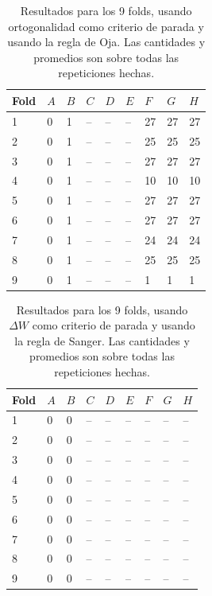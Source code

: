 \documentclass[informe.tex]{subfiles}
\begin{document}
	
	\begin{table}[H]
	  \centering
	  \begin{tabular}{|l|l|l|l|l|l|l|l|l|} \hline
	  Fold & $A$ & $B$ & $C$ & $D$ & $E$ & $F$ & $G$ & $H$ \\ \hline
	  1& 0 & 1 & -- & -- & -- & 27 & 27 & 27 \\ \hline
	  2& 0 & 1 & -- & -- & -- & 25 & 25 & 25 \\ \hline
	  3& 0 & 1 & -- & -- & -- & 27 & 27 & 27 \\ \hline
	  4& 0 & 1 & -- & -- & -- & 10 & 10 & 10 \\ \hline
	  5& 0 & 1 & -- & -- & -- & 27 & 27 & 27 \\ \hline
	  6& 0 & 1 & -- & -- & -- & 27 & 27 & 27 \\ \hline
	  7& 0 & 1 & -- & -- & -- & 24 & 24 & 24 \\ \hline
	  8& 0 & 1 & -- & -- & -- & 25 & 25 & 25 \\ \hline
	  9& 0 & 1 & -- & -- & -- & 1 & 1 & 1 \\ \hline
	  \end{tabular}
	  \caption{Resultados para los 9 folds, usando ortogonalidad como criterio de parada y usando la regla de Oja. Las cantidades y promedios son sobre todas las repeticiones hechas.}
	  \label{tab:ortogonalidad_oja}
	\end{table}

	
	\begin{table}[H]
	  \centering
	  \begin{tabular}{|l|l|l|l|l|l|l|l|l|} \hline
	  Fold & $A$ & $B$ & $C$ & $D$ & $E$ & $F$ & $G$ & $H$ \\ \hline
	  1& 0 & 0 & -- & -- & -- & -- & -- & -- \\ \hline
	  2& 0 & 0 & -- & -- & -- & -- & -- & -- \\ \hline
	  3& 0 & 0 & -- & -- & -- & -- & -- & -- \\ \hline
	  4& 0 & 0 & -- & -- & -- & -- & -- & -- \\ \hline
	  5& 0 & 0 & -- & -- & -- & -- & -- & -- \\ \hline
	  6& 0 & 0 & -- & -- & -- & -- & -- & -- \\ \hline
	  7& 0 & 0 & -- & -- & -- & -- & -- & -- \\ \hline
	  8& 0 & 0 & -- & -- & -- & -- & -- & -- \\ \hline
	  9& 0 & 0 & -- & -- & -- & -- & -- & -- \\ \hline
	  \end{tabular}
	  \caption{Resultados para los 9 folds, usando $\Delta W$ como criterio de parada y usando la regla de Sanger. Las cantidades y promedios son sobre todas las repeticiones hechas.}
	  \label{tab:pesos_sanger}
	\end{table}      
	
\end{document}
